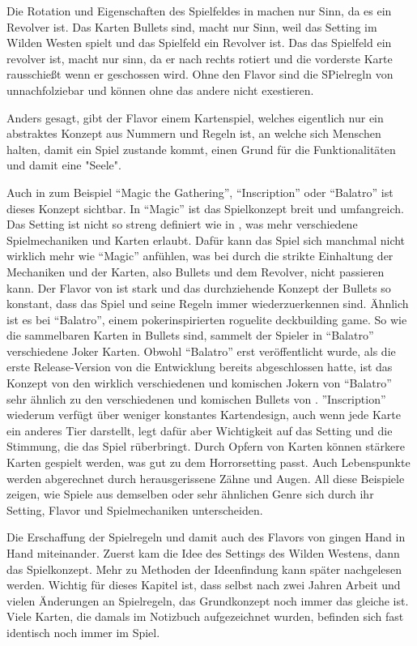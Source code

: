 Die Rotation und Eigenschaften des Spielfeldes in \FF machen nur Sinn, da es ein Revolver ist.
Das Karten Bullets sind, macht nur Sinn, weil das Setting im Wilden Westen spielt und das Spielfeld ein Revolver ist.
Das das Spielfeld ein revolver ist, macht nur sinn, da er nach rechts rotiert und die vorderste Karte rausschießt wenn er geschossen wird.
Ohne den Flavor sind die SPielregln von \FF unnachfolziebar und können ohne das andere nicht exestieren.


Anders gesagt, gibt der Flavor einem Kartenspiel, welches eigentlich nur ein abstraktes Konzept aus Nummern und Regeln ist,
an welche sich Menschen halten, damit ein Spiel zustande kommt, einen Grund für die Funktionalitäten und damit eine "Seele".


Auch in zum Beispiel “Magic the Gathering”, “Inscription” oder “Balatro” ist dieses Konzept sichtbar. In “Magic” ist das Spielkonzept breit und umfangreich.
Das Setting ist nicht so streng definiert wie in \FF, was mehr verschiedene Spielmechaniken und Karten erlaubt.
Dafür kann das Spiel sich manchmal nicht wirklich mehr wie “Magic” anfühlen,
was bei \FF durch die strikte Einhaltung der Mechaniken und der Karten, also Bullets und dem Revolver, nicht passieren kann.
Der Flavor von \FF ist stark und das durchziehende Konzept der Bullets so konstant, dass das Spiel und seine Regeln immer
wiederzuerkennen sind. Ähnlich ist es bei “Balatro”, einem pokerinspirierten roguelite deckbuilding game.
So wie die sammelbaren Karten in \FF Bullets sind, sammelt der Spieler in “Balatro” verschiedene Joker Karten.
Obwohl “Balatro” erst veröffentlicht wurde, als die erste Release-Version von \FF die Entwicklung bereits abgeschlossen hatte,
ist das Konzept von den wirklich verschiedenen und komischen Jokern von “Balatro” sehr ähnlich zu den verschiedenen und
komischen Bullets von \FF.
”Inscription” wiederum verfügt über weniger konstantes Kartendesign, auch wenn jede Karte ein anderes Tier darstellt,
legt dafür aber Wichtigkeit auf das Setting und die Stimmung, die das Spiel rüberbringt. Durch Opfern von Karten können stärkere Karten
gespielt werden, was gut zu dem Horrorsetting passt. Auch Lebenspunkte werden abgerechnet durch herausgerissene Zähne und Augen.
All diese Beispiele zeigen, wie Spiele aus demselben oder sehr ähnlichen Genre sich durch ihr Setting, Flavor und Spielmechaniken unterscheiden.


Die Erschaffung der Spielregeln und damit auch des Flavors von \FF gingen Hand in Hand miteinander.
Zuerst kam die Idee des Settings des Wilden Westens, dann das Spielkonzept. Mehr zu Methoden der Ideenfindung kann später
nachgelesen werden. Wichtig für dieses Kapitel ist, dass selbst nach zwei Jahren Arbeit und vielen Änderungen an Spielregeln,
das Grundkonzept noch immer das gleiche ist. Viele Karten, die damals im Notizbuch aufgezeichnet wurden, befinden sich
fast identisch noch immer im Spiel.



